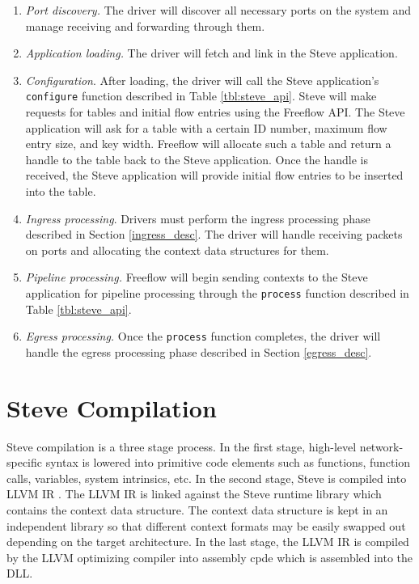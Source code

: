 \begin{enumerate}
\item \textit{Port discovery.} The driver will discover all necessary ports on the system and manage receiving and forwarding through them.

\item \textit{Application loading.} The driver will fetch and link in the Steve application.

\item \textit{Configuration}. After loading, the driver will call the Steve application's \texttt{configure} function described in Table \ref{tbl:steve_api}. Steve will make requests for tables and initial flow entries using the Freeflow API. The Steve application will ask for a table with a certain ID number, maximum flow entry size, and key width. Freeflow will allocate such a table and return a handle to the table back to the Steve application. Once the handle is received, the Steve application will provide initial flow entries to be inserted into the table.

\item \textit{Ingress processing}. Drivers must perform the ingress processing phase described in Section \ref{ingress_desc}. The driver will handle receiving packets on ports and allocating the context data structures for them.

\item \textit{Pipeline processing.} Freeflow will begin sending contexts to the Steve application for pipeline processing through the \texttt{process} function described in Table \ref{tbl:steve_api}.

\item \textit{Egress processing.} Once the \texttt{process} function completes, the driver will handle the egress processing phase described in Section \ref{egress_desc}.
\end{enumerate}

\section{Steve Compilation} \label{compile}

Steve compilation is a three stage process.
In the first stage, high-level network-specific syntax is lowered into primitive code elements such as functions, function calls, variables, system intrinsics, etc.
In the second stage, Steve is compiled into LLVM IR \cite{llvm_webpage}. The LLVM IR is linked against the Steve runtime library which contains the context data structure. The context data structure is kept in an independent library so that different context formats may be easily swapped out depending on the target architecture.
In the last stage, the LLVM IR is compiled by the LLVM optimizing compiler into assembly cpde which is assembled into the DLL.